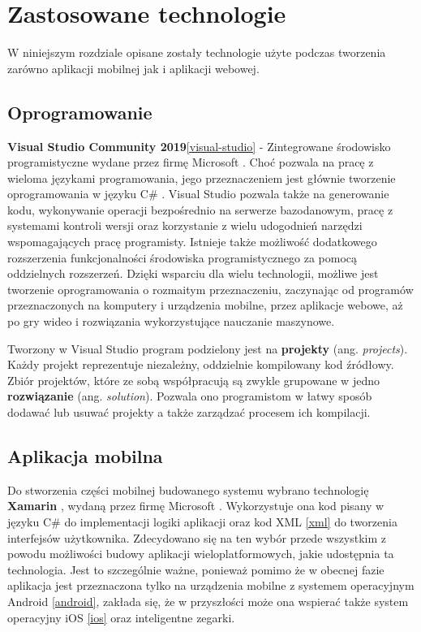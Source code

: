\chapter{Zastosowane technologie}\label{chap:zastosowane-technologie}
W niniejszym rozdziale opisane zostały technologie użyte podczas tworzenia zarówno aplikacji mobilnej jak i aplikacji webowej.
\section{Oprogramowanie}
\textbf{Visual Studio Community 2019}\ref{visual-studio} - Zintegrowane środowisko programistyczne wydane przez firmę Microsoft \cite{microsoft}. Choć pozwala na pracę z wieloma językami programowania, jego przeznaczeniem jest głównie tworzenie oprogramowania w języku C\# \cite{csharp}. Visual Studio pozwala także na generowanie kodu, wykonywanie operacji bezpośrednio na serwerze bazodanowym, pracę z systemami kontroli wersji oraz korzystanie z wielu udogodnień narzędzi wspomagających pracę programisty. Istnieje także możliwość dodatkowego rozszerzenia funkcjonalności środowiska programistycznego za pomocą oddzielnych rozszerzeń. Dzięki wsparciu dla wielu technologii, możliwe jest tworzenie oprogramowania o rozmaitym przeznaczeniu, zaczynając od programów przeznaczonych na komputery i urządzenia mobilne, przez aplikacje webowe, aż po gry wideo i rozwiązania wykorzystujące nauczanie maszynowe.

Tworzony w Visual Studio program podzielony jest na \textbf{projekty} (ang. \textit{projects}). Każdy projekt reprezentuje niezależny, oddzielnie kompilowany kod źródłowy. Zbiór projektów, które ze sobą współpracują są zwykle grupowane w jedno \textbf{rozwiązanie} (ang. \textit{solution}). Pozwala ono programistom w łatwy sposób dodawać lub usuwać projekty a także zarządzać procesem ich kompilacji.

\section{Aplikacja mobilna}
Do stworzenia części mobilnej budowanego systemu wybrano technologię \textbf{Xamarin} \cite{xamarin_docs}, wydaną przez firmę Microsoft \cite{microsoft}. Wykorzystuje ona kod pisany w języku C\# \cite{csharp} do implementacji logiki aplikacji oraz kod XML \ref{xml} do tworzenia interfejsów użytkownika. Zdecydowano się na ten wybór przede wszystkim z powodu możliwości budowy aplikacji wieloplatformowych, jakie udostępnia ta technologia. Jest to szczególnie ważne, ponieważ pomimo że w obecnej fazie aplikacja jest przeznaczona tylko na urządzenia mobilne z systemem operacyjnym Android \ref{android}, zakłada się, że w przyszłości może ona wspierać także system operacyjny iOS \ref{ios} oraz inteligentne zegarki.

